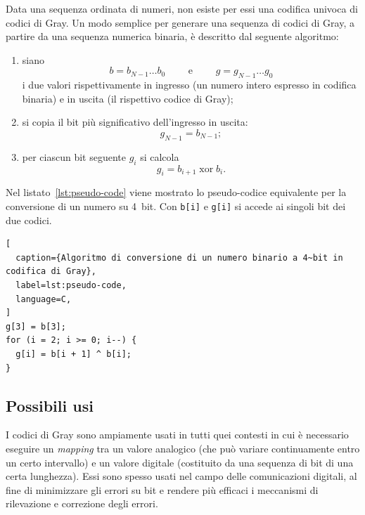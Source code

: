 \documentclass[a4paper,11pt,twoside]{article}
\DeclareMathOperator{\xor}{xor}
\begin{document}
Data una sequenza ordinata di numeri, non esiste per essi una codifica univoca di codici di Gray. Un modo semplice per generare una sequenza di codici di Gray, a partire da una sequenza numerica binaria, è descritto dal seguente algoritmo:
%
\begin{enumerate}
\item siano
  \[ b = b_{N-1}\dots b_0   \qquad \text { e } \qquad g = g_{N-1}\dots g_0 \]
i due valori rispettivamente in ingresso (un numero intero espresso in codifica binaria) e in uscita (il rispettivo codice di Gray);
\item si copia il bit più significativo dell'ingresso in uscita:
  \[ g_{N-1} = b_{N-1}; \]
\item per ciascun bit seguente $g_i$ si calcola
  \[ g_i = b_{i+1} \xor b_i. \]
\end{enumerate}

Nel listato~\ref{lst:pseudo-code} viene mostrato lo pseudo-codice equivalente per la conversione di un numero su 4~bit. Con \texttt{b[i]} e \texttt{g[i]} si accede ai singoli bit dei due codici.

\begin{table}
\centering\small
\caption{Conversione tra codice binario e codice di Gray}
\label{tab:binary-to-gray}
\end{table}

\begin{lstlisting}[
  caption={Algoritmo di conversione di un numero binario a 4~bit in codifica di Gray},
  label=lst:pseudo-code,
  language=C,
]
g[3] = b[3];
for (i = 2; i >= 0; i--) {
  g[i] = b[i + 1] ^ b[i];
}
\end{lstlisting}


\subsection{Possibili usi}

I codici di Gray sono ampiamente usati in tutti quei contesti in cui è necessario eseguire un \emph{mapping} tra un valore analogico (che può variare continuamente entro un certo intervallo) e un valore digitale (costituito da una sequenza di bit di una certa lunghezza). Essi sono spesso usati nel campo delle comunicazioni digitali, al fine di minimizzare gli errori su bit e rendere più efficaci i meccanismi di rilevazione e correzione degli errori.
\end{document}
